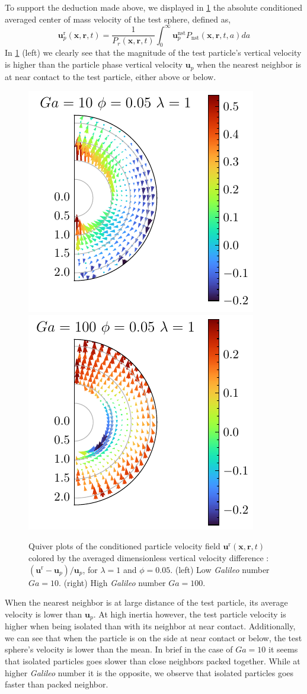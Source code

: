 To support the deduction made above, we displayed in \ref{fig:unst_ga} the absolute conditioned averaged center of mass velocity of the test sphere, defined as,
\begin{equation*}
    \textbf{u}^\text{r}_p(\textbf{x},\textbf{r},t)  
    =
    \frac{1}{P_r(\textbf{x},\textbf{r},t)}
    \int_0^\infty \textbf{u}^\text{nst}_pP_\text{nst}(\textbf{x},\textbf{r},t,a) da
\end{equation*}
In \ref{fig:unst_ga} (left) we clearly see that the magnitude of the test particle's vertical velocity is higher than the particle phase vertical velocity $\textbf{u}_p$ when the nearest neighbor is at near contact to the test particle, either above or below.
\begin{figure}[h!]
    \centering
    \includegraphics[height=0.35\textwidth]{image/HOMOGENEOUS_NEW/Dist/U_l_1_Ga_10_PHI_5.pdf}
    \includegraphics[height=0.35\textwidth]{image/HOMOGENEOUS_NEW/Dist/U_l_1_Ga_100_PHI_5.pdf}
    \caption{
         Quiver plots of the conditioned particle velocity field $\textbf{u}^\text{r}(\textbf{x},\textbf{r},t)$ colored by the averaged dimensionless vertical velocity difference : $(\textbf{u}^\text{r} - \textbf{u}_p )/ \textbf{u}_p$, for $\lambda = 1$ and $\phi = 0.05$. 
         (left) Low \textit{Galileo} number $Ga = 10$.
        (right) High \textit{Galileo} number $Ga = 100$.
         }
    \label{fig:unst_ga}
\end{figure}
When the nearest neighbor is at large distance of the test particle, its average velocity is lower than $\textbf{u}_p$. 
At high inertia however, the test particle velocity is higher when being isolated than with its neighbor at near contact. 
Additionally, we can see that when the particle is on the side at near contact or below, the test sphere's velocity  is lower than the mean. 
In brief in the case of $Ga = 10$ it seems that isolated particles goes slower than close neighbors packed together. 
While at higher \textit{Galileo} number it is the opposite, we observe that isolated particles  goes faster than packed neighbor. 



